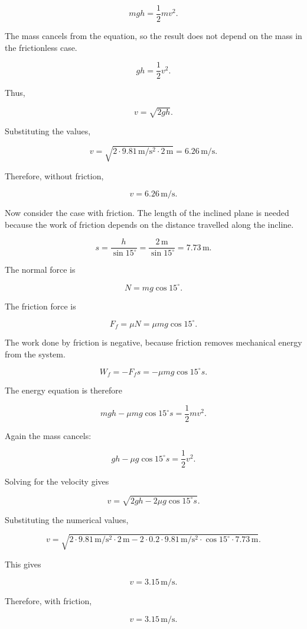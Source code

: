 \documentclass[letterpaper,12pt]{letter}
\begin{document}
\begin{enumerate}[label=\Roman*.]
\begin{enumerate}[label=\arabic*.]
$$mgh=\frac{1}{2}mv^2.$$

The mass cancels from the equation, so the result does not depend on the mass in the frictionless case.

$$gh=\frac{1}{2}v^2.$$

Thus,

$$v=\sqrt{2gh}.$$

Substituting the values,

$$v=\sqrt{2\cdot9.81\,\mathrm{m/s^2}\cdot2\,\mathrm{m}}=6.26\,\mathrm{m/s}.$$

Therefore, without friction,

$$\boxed{v=6.26\,\mathrm{m/s}}.$$

Now consider the case with friction. The length of the inclined plane is needed because the work of friction depends on the distance travelled along the incline.

$$s=\frac{h}{\sin15^\circ}=\frac{2\,\mathrm{m}}{\sin15^\circ}=7.73\,\mathrm{m}.$$

The normal force is

$$N=mg\cos15^\circ.$$

The friction force is

$$F_f=\mu N=\mu mg\cos15^\circ.$$

The work done by friction is negative, because friction removes mechanical energy from the system.

$$W_f=-F_fs=-\mu mg\cos15^\circ s.$$

The energy equation is therefore

$$mgh-\mu mg\cos15^\circ s=\frac{1}{2}mv^2.$$

Again the mass cancels:

$$gh-\mu g\cos15^\circ s=\frac{1}{2}v^2.$$

Solving for the velocity gives

$$v=\sqrt{2gh-2\mu g\cos15^\circ s}.$$

Substituting the numerical values,

$$v=\sqrt{2\cdot9.81\,\mathrm{m/s^2}\cdot2\,\mathrm{m}-2\cdot0.2\cdot9.81\,\mathrm{m/s^2}\cdot\cos15^\circ\cdot7.73\,\mathrm{m}}.$$

This gives

$$v=3.15\,\mathrm{m/s}.$$

Therefore, with friction,

$$\boxed{v=3.15\,\mathrm{m/s}}.$$



\end{enumerate}
\end{enumerate}
\end{document}
